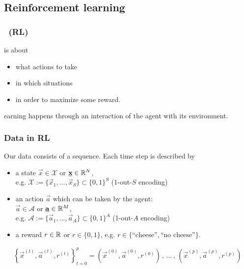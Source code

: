 \subsection{Reinforcement learning} \label{sec:reinforcement}

\begin{frame}\frametitle{\subsecname~(RL)}

 is about
\begin{itemize}
    \item[] what actions to take
    \item[] in which situations
    \item[] in order to maximize some reward.
\end{itemize}
earning happens through an interaction of the agent with its environment.

\end{frame}

\begin{frame}\frametitle{Data in RL}


Our data consists of a sequence. Each time step is described by 

\begin{itemize}
\item a state $\vec x \in \mathcal{X}$ or $\underline{\mathbf{x}} \in \mathbb{R}^N$,\\
e.g. $\mathcal{X} := \{ \vec x_1, \ldots, \vec x_S\} \subset \{0,1\}^S$ (1-out-$S$ encoding)
\pause
\item an action $\vec a$ which can be taken by the agent:\\

$\vec a \in \mathcal{A}$ or $\underline{\mathbf{a}} \in \mathbb{R}^M$,\\
e.g. $\mathcal{A} := \{ \vec a_1, \ldots, \vec a_A\} \subset \{0,1\}^A$ (1-out-$A$ encoding)
\pause
\item a reward $r \in \mathbb{R}$ or $r \in \{0,1\}$, e.g. $r \in \{\text{``cheese''},\text{``no cheese''}\}$.

\end{itemize}

\pause
{}

\begin{align}
\label{eq:chain}
\left\{\vec x^{(t)}, \vec a^{(t)}, r^{(t)}\right\}_{t=0}^{p} = 
\left( \vec x^{(0)}, \vec a^{(0)}, r^{(0)} \right) \,,\, \ldots \,,\, \left(\vec x^{(p)}, \vec a^{(p)}, r^{(p)} \right)
\end{align}



\end{frame}

